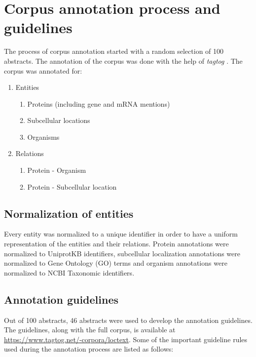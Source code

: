 \section{Corpus annotation process and guidelines}

The process of corpus annotation started with a random selection of 100 abstracts. %
The annotation of the corpus was done with the help of \textit{tagtog} \cite{cejuela2014tagtog}. The corpus was annotated for:

\begin{enumerate}
\item Entities
\begin{enumerate}
\item Proteins (including gene and mRNA mentions)
\item Subcellular locations
\item Organisms
\end{enumerate}
\item Relations
\begin{enumerate}
\item Protein - Organism
\item Protein - Subcellular location
\end{enumerate}
\end{enumerate}

\subsection*{Normalization of entities}

Every entity was normalized to a unique identifier in order to have a uniform representation of the entities and their relations. Protein annotations were normalized to UniprotKB \cite{magrane2011uniprot} identifiers, subcellular localization annotations were normalized to Gene Ontology (GO) \cite{ashburner2000gene} terms and organism annotations were normalized to NCBI Taxonomic \cite{ncbiTaxonomy} identifiers.

\subsection*{Annotation guidelines}

Out of 100 abstracts, 46 abstracts were used to develop the annotation guidelines. The guidelines, along with the full corpus, is available at \url{https://www.tagtog.net/-corpora/loctext}. Some of the important guideline rules used during the annotation process are listed as follows:

